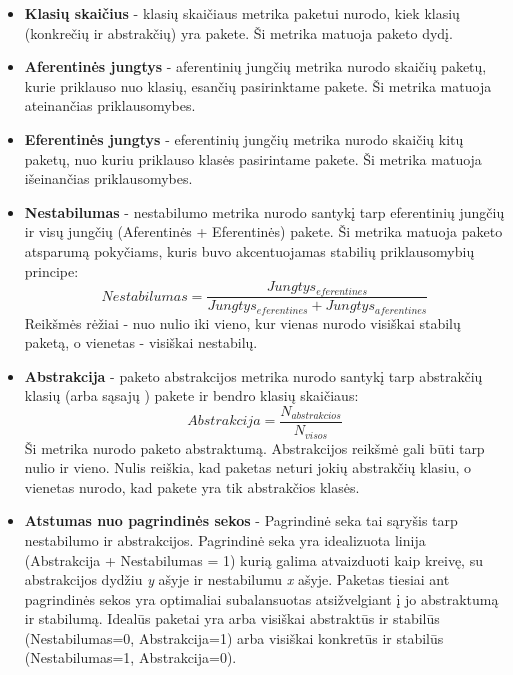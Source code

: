 \begin{itemize}
    \item \textbf{Klasių skaičius} - klasių skaičiaus metrika paketui nurodo, kiek klasių (konkrečių ir abstrakčių) yra pakete.
    Ši metrika matuoja paketo dydį.
    \item \textbf{Aferentinės jungtys } - aferentinių jungčių metrika nurodo
    skaičių paketų, kurie priklauso nuo klasių, esančių pasirinktame pakete.
    Ši metrika matuoja ateinančias priklausomybes.
    \item \textbf{Eferentinės jungtys } - eferentinių jungčių metrika nurodo skaičių kitų paketų,
    nuo kuriu priklauso klasės pasirintame pakete.
    Ši metrika matuoja išeinančias priklausomybes.
    \item \textbf{Nestabilumas} - nestabilumo metrika nurodo santykį tarp eferentinių jungčių ir
    visų jungčių (Aferentinės + Eferentinės) pakete.
    Ši metrika matuoja paketo atsparumą pokyčiams, kuris buvo akcentuojamas stabilių priklausomybių principe:
    \begin{equation}
        Nestabilumas=\frac{Jungtys_{eferentines}}{Jungtys_{eferentines} + Jungtys_{aferentines}}
    \end{equation}
    Reikšmės rėžiai - nuo nulio iki vieno, kur vienas nurodo visiškai stabilų paketą, o vienetas - visiškai nestabilų.
    \item \textbf{Abstrakcija} - paketo abstrakcijos metrika nurodo santykį tarp abstrakčių klasių (arba sąsajų ) pakete ir bendro klasių skaičiaus:
    \begin{equation}
        Abstrakcija=\frac{N_{abstrakcios}}{N_{visos}}
    \end{equation}
    Ši metrika nurodo paketo abstraktumą.
    Abstrakcijos reikšmė gali būti tarp nulio ir vieno.
    Nulis reiškia, kad paketas neturi jokių abstrakčių klasiu, o vienetas nurodo, kad pakete yra tik abstrakčios klasės.
    \item \textbf{Atstumas nuo pagrindinės sekos} -
    Pagrindinė seka tai sąryšis tarp nestabilumo ir abstrakcijos.
    Pagrindinė seka yra idealizuota linija (Abstrakcija + Nestabilumas = 1)  kurią galima atvaizduoti kaip kreivę, su abstrakcijos dydžiu \textit{y} ašyje ir nestabilumu \textit{x} ašyje.
    Paketas tiesiai ant pagrindinės sekos yra optimaliai subalansuotas atsižvelgiant į jo abstraktumą ir stabilumą.
    Idealūs paketai yra arba visiškai abstraktūs ir stabilūs (Nestabilumas=0, Abstrakcija=1) arba visiškai konkretūs ir stabilūs (Nestabilumas=1, Abstrakcija=0).

\end{itemize}
